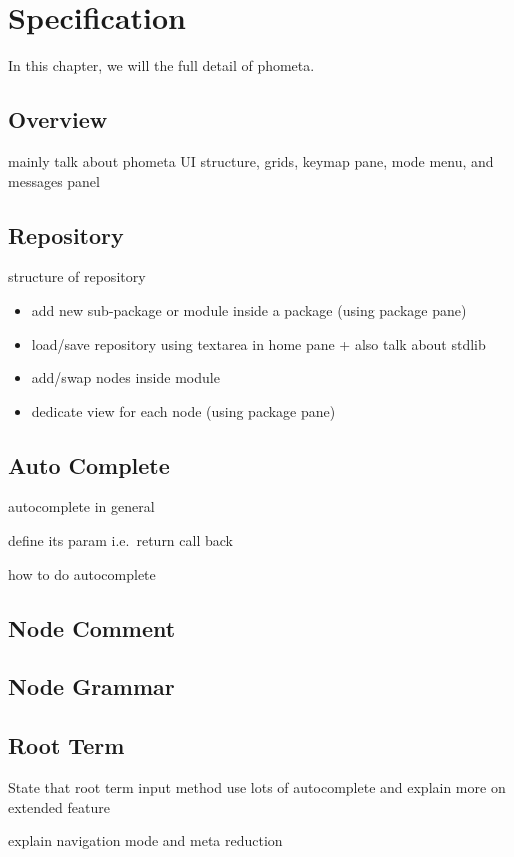 \documentclass[master.tex]{subfiles}
\begin{document}
\chapter{Specification}
\label{chap:specification}

In this chapter, we will the full detail of phometa.
\section{Overview}
mainly talk about phometa UI structure, grids, keymap pane, mode menu, and messages panel

\section{Repository}
structure of repository
\begin{itemize}
\item add new sub-package or module inside a package (using package pane)
\item load/save repository using textarea in home pane + also talk about stdlib
\item add/swap nodes inside module
\item dedicate view for each node (using package pane)
\end{itemize}

\section{Auto Complete}
autocomplete in general

define its param i.e.\ return call back

how to do autocomplete

\section{Node Comment}

\section{Node Grammar}

\section{Root Term}

State that root term input method use lots of autocomplete and explain more on
extended feature

explain navigation mode and meta reduction
\end{document}
